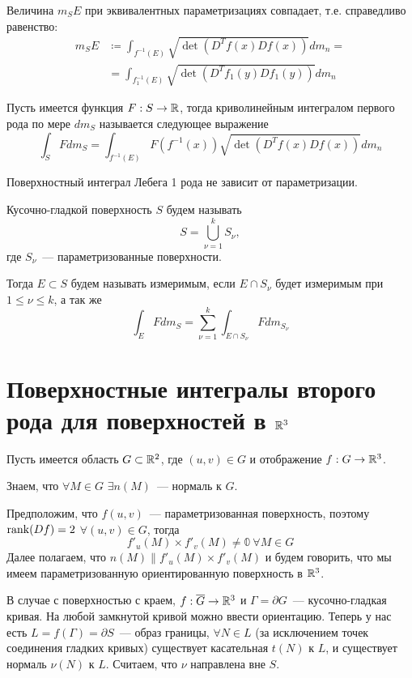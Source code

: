 \documentclass[main]{subfiles}
\begin{document}
\begin{theorem}
    Величина $m_S E$ при эквивалентных параметризациях совпадает, т.е. справедливо равенство:
    \begin{align*}
        m_S E & \coloneq \int_{f^{-1}(E)} \sqrt{\det(D^Tf(x) Df(x))} dm_n = \\
              & = \int_{f_1^{-1}(E)} \sqrt{\det(D^Tf_1(y) Df_1(y))} dm_n
    \end{align*}
\end{theorem}

\begin{definition}
    Пусть имеется функция $F: S \to \mathbb{R}$, тогда криволинейным интегралом первого рода по мере $dm_S$ называется следующее выражение
    \[\int_S F dm_S = \int_{f^{-1}(E)} F(f^{-1}(x)) \sqrt{\det(D^Tf(x) Df(x))} dm_n\]
\end{definition}
\begin{theorem}
    Поверхностный интеграл Лебега 1 рода не зависит от параметризации.
\end{theorem}

\begin{definition}
    Кусочно-гладкой поверхность $S$ будем называть
    \[S = \bigcup_{\nu = 1}^k S_\nu,\]
    где $S_\nu$~--- параметризованные поверхности.

    Тогда $E \subset S$ будем называть измеримым, если $E \cap S_\nu$ будет измеримым при $1 \le \nu \le k$, а так же
    \[\int_E F dm_S = \sum_{\nu = 1}^{k} \int_{E \cap S_\nu} F dm_{S_\nu}\]
\end{definition}

\section{Поверхностные интегралы второго рода для поверхностей в \texorpdfstring{$\mathbb{R}^3$}{R\textasciicircum 3}}
\begin{definition}
    Пусть имеется область $G \subset \mathbb{R}^2$, где $(u, v) \in G$ и отображение $f: G \to \mathbb{R}^3$.

    Знаем, что $\forall M \in G$ $\exists n(M)$~--- нормаль к $G$.

    Предположим, что $f(u, v)$~--- параметризованная поверхность, поэтому $\operatorname{rank}(Df) = 2$ $\forall (u, v) \in G$, тогда
    \[f'_u(M) \times f'_v(M) \neq \mathbb{0}\ \forall M \in G\]
    Далее полагаем, что $n(M) \parallel f'_u(M) \times f'_v(M)$ и будем говорить, что мы имеем параметризованную ориентированную поверхность в $\mathbb{R}^3$.
\end{definition}
В случае с поверхностью с краем, $f: \overline{G} \to \mathbb{R}^3$ и $\Gamma = \partial G$~--- кусочно-гладкая кривая.
На любой замкнутой кривой можно ввести ориентацию.
Теперь у нас есть $L = f(\Gamma) = \partial S$~--- образ границы, $\forall N \in L$ (за исключением точек соединения гладких кривых) существует касательная $t(N)$ к $L$, и существует нормаль $\nu(N)$ к $L$.
Считаем, что $\nu$ направлена вне $S$.
\end{document}
